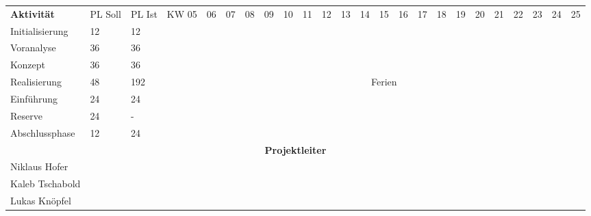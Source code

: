 \documentclass[10pt,paper=a4,final]{scrartcl}
\begin{document}
\begin{landscape}
\begin{tabularx}{\textwidth}{ |p{4.0cm}|l|l|l|l|l|l|l|l|l|l|l|l|l|l|l|l|l|l|l|l|l|l|l| }
\cline{1-24}	%
\bf Aktivit\"at & PL Soll & PL Ist & KW 05 & 06 & 07 & 08 & 09 & 10 & 11 & 12 & 13 & 14 & 15 & 16 & 17 & 18 & 19 & 20 & 21 & 22 & 23 & 24 & 25 \\
\cline{1-24}
Initialisierung & 12 & 12 & & \cellcolor[gray]{0.7} & & & & & & & & & & & & & & & & & & & \\
\cline{1-24}
Voranalyse & 36 & 36 & & & \cellcolor[gray]{0.7} & \cellcolor[gray]{0.7} & \cellcolor[gray]{0.7} & & & & & & & & & & & & & & & & \\
\cline{1-24}
Konzept & 36 & 36 & & & & & & \cellcolor[gray]{0.7} & \cellcolor[gray]{0.7} & \cellcolor[gray]{0.7} & & & & & & & & & & & & & \\
\cline{1-24}
Realisierung & 48 & 192 \cellcolor{red!100!} & & & & & & & & & \cellcolor[gray]{0.7} & \multicolumn{3}{|c|}{Ferien \cellcolor{green!70!}} & \cellcolor[gray]{0.7} & \cellcolor[gray]{0.7} & \cellcolor[gray]{0.7} & & & & & & \\
\cline{1-24}
Einf\"uhrung & 24 & 24 & & & & & & & & & & & & & & & & \cellcolor[gray]{0.7} & \cellcolor[gray]{0.7} & & & & \\
\cline{1-24}
Reserve & 24 & - & & & & & & & & & & & & & & & & & & \cellcolor[gray]{0.7} & \cellcolor[gray]{0.7} & & \\
\cline{1-24}
Abschlussphase & 12 & 24 \cellcolor{red!100!} & & & & & & & & & & & & & & & & & & & & \cellcolor[gray]{0.7} & \cellcolor[gray]{0.7}\\
\cline{1-24}
\multicolumn{24}{|c|}{\bf Projektleiter} \\
\cline{1-24}
Niklaus Hofer & & & \cellcolor[gray]{0.7} & \cellcolor[gray]{0.7} & \cellcolor[gray]{0.7} & \cellcolor[gray]{0.7} & \cellcolor[gray]{0.7} & & & & & & & & & & & & & & & & \\
\cline{1-24}
Kaleb Tschabold & & & & & & & & \cellcolor[gray]{0.7} & \cellcolor[gray]{0.7} & \cellcolor[gray]{0.7} & \cellcolor[gray]{0.7} & \cellcolor[gray]{0.7} & \cellcolor[gray]{0.7} & \cellcolor[gray]{0.7} & \cellcolor[gray]{0.7} & & & & & & & & \\
\cline{1-24}
Lukas Kn\"opfel & & & & & & & & & & & & & & & & \cellcolor[gray]{0.7} & \cellcolor[gray]{0.7} & \cellcolor[gray]{0.7} & \cellcolor[gray]{0.7} & \cellcolor[gray]{0.7} & \cellcolor[gray]{0.7} & \cellcolor[gray]{0.7} & \cellcolor[gray]{0.7}\\
\cline{1-24}
\end{tabularx}
\end{landscape}
\end{document}
